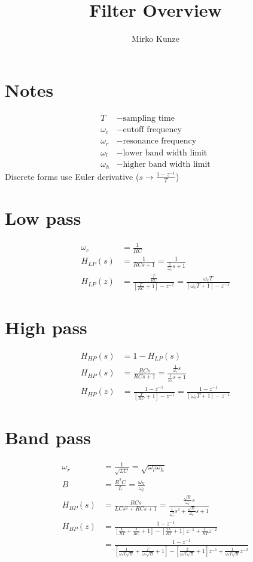 \documentclass[a4paper]{article}
\title{Filter Overview}
\author{Mirko Kunze}
\begin{document}
\pagestyle{empty}
\section*{Notes}
\begin{align*}
T &- \text{sampling time}\\
\omega_c &- \text{cutoff frequency}\\
\omega_r &- \text{resonance frequency}\\
\omega_l &- \text{lower band width limit}\\
\omega_h &- \text{higher band width limit}
\end{align*}
\hspace{3cm} Discrete forms use Euler derivative ($s\rightarrow\frac{1-z^{-1}}{T}$)


\section*{Low pass}
\begin{align*}
\omega_c &= \frac{1}{RC}\\
H_{LP}(s) &= \frac{1}{RCs+1}
= \frac{1}{\frac{1}{\omega_c}s+1}\\
H_{LP}(z) &= \frac{\frac{T}{RC}}{[\frac{T}{RC} +1] - z^{-1}}
= \frac{\omega_cT}{[\omega_cT +1] - z^{-1}}
\end{align*}

\section*{High pass}
\begin{align*}
H_{HP}(s) &= 1-H_{LP}(s)\\
H_{HP}(s) &= \frac{RCs}{RCs+1}
= \frac{\frac{1}{\omega_c}s}{\frac{1}{\omega_c}s+1}\\
H_{HP}(z) &= \frac{1-z^{-1}}{[\frac{T}{RC} + 1] - z^{-1}}
= \frac{1-z^{-1}}{[\omega_cT + 1] - z^{-1}}
\end{align*}

\section*{Band pass}
\begin{align*}
\omega_r &= \frac{1}{\sqrt{LC}}
= \sqrt{\omega_l \omega_h}\\
B &= \frac{R^2C}{L}
= \frac{\omega_h}{\omega_l}\\
H_{BP}(s) &= \frac{RCs}{LCs^2 + RCs + 1}
= \frac{\frac{\sqrt{B}}{\omega_r}s}{\frac{1}{\omega_r^2}s^2 + \frac{\sqrt{B}}{\omega_r}s + 1}\\
H_{BP}(z) &= \frac{1-z^{-1}}{[\frac{L}{RT}+\frac{T}{RC}+1] - [\frac{2L}{RT}+1]z^{-1} + \frac{L}{RT}z^{-2}}\\
&= \frac{1-z^{-1}}{[\frac{1}{\omega_rT\sqrt{B}}+\frac{T}{\omega_r\sqrt{B}}+1] - [\frac{2}{\omega_rT\sqrt{B}}+1]z^{-1} + \frac{1}{\omega_rT\sqrt{B}}z^{-2}}
\end{align*}
\end{document}
